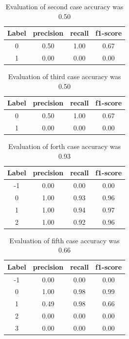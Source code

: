\begin{table}[]
	\centering
	\caption{Evaluation of second case accuracy was 0.50}
	\label{tab:2}
	\begin{tabular}{cccc}
		\textbf{Label} & \textbf{precision} & \textbf{recall} & \textbf{f1-score} \\
		\hline
		0 & 0.50 & 1.00 & 0.67\\
		1 & 0.00 & 0.00 & 0.00
	\end{tabular}
\end{table}

\begin{table}[]
	\centering
	\caption{Evaluation of third case accuracy was 0.50}
	\label{tab:3}
	\begin{tabular}{cccc}
		\textbf{Label} & \textbf{precision} & \textbf{recall} & \textbf{f1-score} \\
		\hline
		0       &0.50 &     1.00  &    0.67 \\
		1       &0.00&      0.00   &   0.00 
	\end{tabular}
\end{table}

\begin{table}[]
	\centering
	\caption{Evaluation of forth case accuracy was 0.93}
	\label{tab:4}
	\begin{tabular}{cccc}
		\textbf{Label} & \textbf{precision} & \textbf{recall} & \textbf{f1-score} \\
		\hline
		  -1    &   0.00  &    0.00   &   0.00  \\       
			0    &   1.00  &    0.93   &   0.96  \\
			1    &   1.00  &    0.94   &   0.97  \\
			2    &  1.00   &    0.92   & 0.96    \\
	\end{tabular}
\end{table}

\begin{table}[]
	\centering
	\caption{Evaluation of fifth case accuracy was 0.66}
	\label{tab:5}
	\begin{tabular}{cccc}
		\textbf{Label} & \textbf{precision} & \textbf{recall} & \textbf{f1-score} \\
		\hline
          -1   &   0.00  &    0.00  &    0.00     \\
			0   &   1.00  &    0.98  &    0.99     \\
			1   &   0.49  &    0.98  &    0.66     \\
			2   &   0.00  &    0.00  &    0.00     \\
			3   &   0.00  &    0.00  &    0.00     \\
	\end{tabular}
\end{table}

